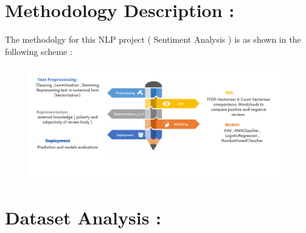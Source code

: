 \documentclass{article}
\begin{document}
\section{ Methodology Description : }
The methodolgy for this NLP project ( Sentiment Analysis ) is as shown in the following scheme :
\begin{figure}[H]
    \centering
    \includegraphics[scale=0.3]{src/img/methodology.png}
    \label{fig:my_label}
\end{figure}
\section{Dataset Analysis : }
\end{document}
